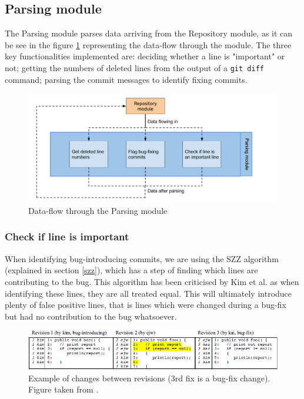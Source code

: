 \documentclass[12pt,twoside,notitlepage]{report}
\begin{document}
\subsection{Parsing module}\label{parsing}
The Parsing module parses data arriving from the Repository module, as it can be see in the figure \ref{parsing_module} representing the data-flow through the module. The three key functionalities implemented are: deciding whether a line is "important" or not; getting the numbers of deleted lines from the output of a \texttt{git diff} command; parsing the commit messages to identify fixing commits. 
\begin{figure}[h]
\includegraphics[width=1.0\textwidth]{parsing_module.png}
\caption{Data-flow through the Parsing module}

\label{parsing_module}
\end{figure}
\subsubsection*{Check if line is important}
When identifying bug-introducing commits, we are using the SZZ algorithm\cite{SZZ} (explained in section \ref{szz}), which has a step of finding which lines are contributing to the bug. This algorithm has been criticised by Kim et al.\cite{KimZim} as when identifying these lines, they are all treated equal. This will ultimately introduce plenty of false positive lines, that is lines which were changed during a bug-fix but had no contribution to the bug whatsoever.
\begin{figure}[h]
\includegraphics[width=1.0\textwidth]{automatic_identification.jpg}
\caption[Example of changes between revisions.]{Example of changes between revisions (3rd fix is a bug-fix change). Figure taken from \cite{KimZim}.}
\label{automatic_identification}
\end{figure}
\end{document}
